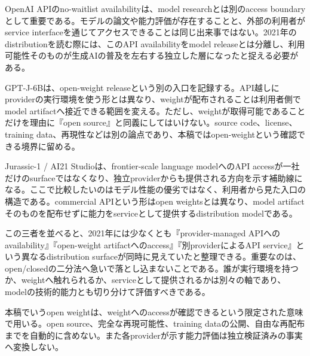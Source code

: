 
OpenAI APIのno-waitlist availabilityは、model researchとは別のaccess boundaryとして重要である。モデルの論文や能力評価が存在することと、外部の利用者がservice interfaceを通じてアクセスできることは同じ出来事ではない。2021年のdistributionを読む際には、このAPI availabilityをmodel releaseとは分離し、利用可能性そのものが生成AIの普及を左右する独立した層になったと捉える必要がある。\autocite{src-b50beb89f16f}


GPT-J-6Bは、open-weight releaseという別の入口を記録する。API越しにproviderの実行環境を使う形とは異なり、weightが配布されることは利用者側でmodel artifactへ接近できる範囲を変える。ただし、weightが取得可能であることだけを理由に『open source』と同義にしてはいけない。source code、license、training data、再現性などは別の論点であり、本稿ではopen-weightという確認できる境界に留める。\autocite{src-1b063a3564f3}


Jurassic-1 / AI21 Studioは、frontier-scale language modelへのAPI accessが一社だけのsurfaceではなくなり、独立providerからも提供される方向を示す補助線になる。ここで比較したいのはモデル性能の優劣ではなく、利用者から見た入口の構造である。commercial APIという形はopen weightsとは異なり、model artifactそのものを配布せずに能力をserviceとして提供するdistribution modelである。\autocite{src-bf581c89a17f}


この三者を並べると、2021年には少なくとも『provider-managed APIへのavailability』『open-weight artifactへのaccess』『別providerによるAPI service』という異なるdistribution surfaceが同時に見えていたと整理できる。重要なのは、open/closedの二分法へ急いで落とし込まないことである。誰が実行環境を持つか、weightへ触れられるか、serviceとして提供されるかは別々の軸であり、modelの技術的能力とも切り分けて評価すべきである。\autocite{src-1b063a3564f3,src-b50beb89f16f,src-bf581c89a17f}


\begin{claimboundary}
本稿でいうopen weightは、weightへのaccessが確認できるという限定された意味で用いる。open source、完全な再現可能性、training dataの公開、自由な再配布までを自動的に含めない。また各providerが示す能力評価は独立検証済みの事実へ変換しない。\autocite{src-1b063a3564f3,src-b50beb89f16f,src-bf581c89a17f}
\end{claimboundary}

